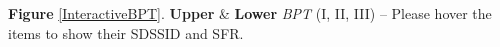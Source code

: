 \label{InteractiveBPT} \textbf{Figure} \ref{InteractiveBPT}. \textbf{Upper} & \textbf{Lower} \textit{BPT} (I, II, III) – Please hover the items to show their SDSSID and SFR.